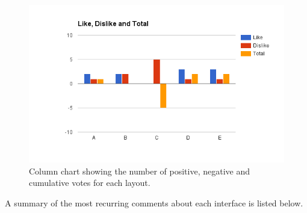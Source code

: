 \documentclass{mproj}
\begin{document}
\begin{figure}[h]
	\centering
	\includegraphics[width=\textwidth]{images/layout_feedback}
	\caption{Column chart showing the number of positive, negative and cumulative votes for each layout.}
	\label{fig:layout_feedback}
\end{figure}

A summary of the most recurring comments about each interface is listed below.
\end{document}
